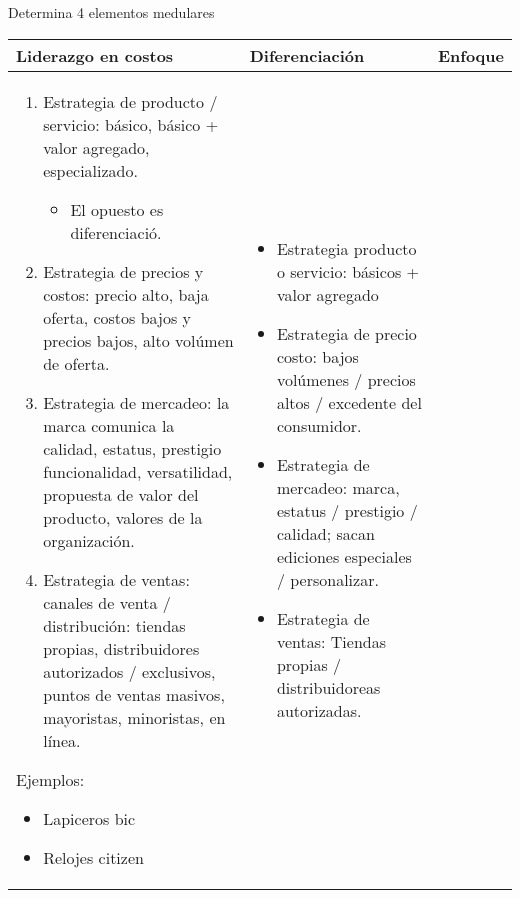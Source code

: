  
Determina 4 elementos medulares
\begin{center}
    \begin{tabular}{ | p{5.8cm} | p{5.8cm} | p{5.8cm} |}
        \hline
            Liderazgo en costos & 
            Diferenciación &
            Enfoque
                \\
        \hline
        \begin{enumerate}
            \item Estrategia de producto / servicio: básico, básico + valor agregado, especializado.
                \begin{itemize}
                    \item El opuesto es diferenciació.
                \end{itemize}
            \item Estrategia de precios y costos: precio alto, baja oferta, costos bajos y precios bajos, alto volúmen de oferta.
            \item Estrategia de mercadeo: la marca comunica la calidad, estatus, prestigio funcionalidad, versatilidad, propuesta de valor del producto, valores de la organización.
            \item Estrategia de ventas: canales de venta / distribución: tiendas propias, distribuidores autorizados / exclusivos, puntos de ventas masivos, mayoristas, minoristas, en línea.
        \end{enumerate}
        Ejemplos:
            \begin{itemize}
                \item Lapiceros bic 
                \item Relojes citizen
            \end{itemize}
        & 
        \begin{itemize}
            \item Estrategia producto o servicio: básicos +  valor agregado
            \item Estrategia de precio costo: bajos volúmenes / precios altos / excedente del consumidor.
            \item Estrategia de mercadeo: marca, estatus / prestigio / calidad; sacan ediciones especiales / personalizar.
            \item Estrategia de ventas: Tiendas propias / distribuidoreas autorizadas. 
        \end{itemize} 

\end{tabular}
\end{center}
